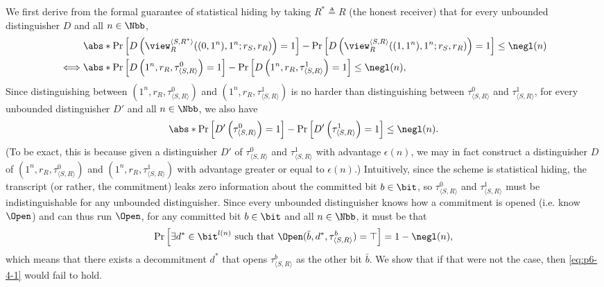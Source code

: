 \begin{answer}[d]
    We first derive from the formal guarantee of statistical hiding by taking $R^\ast\triangleq R$ (the honest receiver) that for every unbounded distinguisher $D$ and all $n\in\Nbb$,
    \begin{align*}
        &\abs*{\Pr\left[D\left(\view^{\langle S, R^\ast \rangle}_{R}((0,1^n),1^n;r_S, r_{R})\right)=1 \right]
        -\Pr\left[D\left(\view^{\langle S, R \rangle}_{R}((1,1^n),1^n;r_S, r_{R})\right)=1 \right]} \le \negl(n) \\
        \iff& \abs*{\Pr\left[D\left(1^n, r_{R}, \tau_{\langle S,R\rangle}^0 \right)=1 \right]
        -\Pr\left[D\left(1^n, r_{R}, \tau_{\langle S,R\rangle}^1 \right)=1 \right]}  \le \negl(n),
    \end{align*}
    Since distinguishing between $(1^n, r_{R}, \tau_{\langle S,R\rangle}^0)$ and $(1^n, r_{R}, \tau_{\langle S,R\rangle}^1)$ is no harder than distinguishing between $\tau_{\langle S,R\rangle}^0$ and $\tau_{\langle S,R\rangle}^1$, for every unbounded distinguisher $D'$ and all $n\in\Nbb$, we also have 
    \begin{equation}\label{eq:p6-4-1}
        \abs*{\Pr\left[D'\left(\tau_{\langle S,R\rangle}^0\right)=1 \right]
        -\Pr\left[D'\left(\tau_{\langle S,R\rangle}^1 \right)=1 \right]}  \le \negl(n).
    \end{equation} 
    (To be exact, this is because given a distinguisher $D'$ of $\tau_{\langle S,R\rangle}^0$ and $\tau_{\langle S,R\rangle}^1$ with advantage $\epsilon(n)$, we may in fact construct a distinguisher $D$ of $(1^n, r_{R}, \tau_{\langle S,R\rangle}^0)$ and $(1^n, r_{R}, \tau_{\langle S,R\rangle}^1)$ with advantage greater or equal to $\epsilon(n)$.)
    Intuitively, since the scheme is statistical hiding, the transcript (or rather, the commitment) leaks zero information about the committed bit $b\in\bit$, so $\tau_{\langle S,R\rangle}^0$ and $\tau_{\langle S,R\rangle}^1$ must be indistinguishable for any unbounded distinguisher. Since every unbounded distinguisher knows how a commitment is opened (i.e. know $\Open$) and can thus run $\Open$, for any committed bit $b\in\bit$ and all $n\in\Nbb$, it must be that
    \[
        \Pr\left[\exists d^\ast\in\bit^{l(n)} \textrm{ such that } \Open(\bar{b}, d^\ast,\tau_{\langle S,R\rangle}^b)=\top\right] =1-\negl(n),
    \]
    which means that there exists a decommitment $d^\ast$ that opens $\tau_{\langle S,R\rangle}^b$ as the other bit $\bar{b}$.
    We show that if that were not the case, then \eqref{eq:p6-4-1} would fail to hold.
    \begin{claim}\label{claim:p6-4-1}

\end{claim}
\end{answer}
